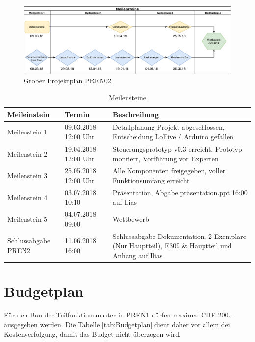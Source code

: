 \documentclass[a4paper]{report}
\begin{document}
\begin{figure}[h!]
	\includegraphics[width=\linewidth,keepaspectratio]{Rahmenplan}
	\caption{Grober Projektplan PREN02}
	\label{fig:GrobProjekt}
\end{figure}

\begin{table}[h!]
\vspace{1em}
\noindent
\begin{tabular}{|p{}|p{}|p{}|}
	\hline
	\textbf{Meileinstein} & \textbf{Termin} & \textbf{Beschreibung} \\
	\hline
	Meilenstein 1 & 09.03.2018 12:00 Uhr & Detailplanung Projekt abgeschlossen, Entscheidung LoFive / Arduino gefallen\\
	\hline
	Meilenstein 2 & 19.04.2018 12:00 Uhr & Steuerungsprototyp v0.3 erreicht, Prototyp  montiert, Vorführung vor Experten\\
	\hline
	Meilenstein 3 & 25.05.2018 12:00 Uhr & Alle Komponenten freigegeben, voller Funktionsumfang erreicht\\
	\hline
	Meilenstein 4 & 03.07.2018 10:10 & Präsentation, Abgabe präsentation.ppt 16:00 auf Ilias\\
	\hline
	Meilenstein 5 & 04.07.2018 09:00 & Wettbewerb\\
	\hline
	Schlussabgabe PREN2 & 11.06.2018 16:00 & Schlussabgabe Dokumentation, 2 Exemplare (Nur Hauptteil), E309 \& Hauptteil und Anhang auf Ilias \\
	\hline
	\end{tabular}
	\caption{Meilensteine}
	\label{tab:Meilensteine}
\end{table}

\newpage

\section{Budgetplan}
\label{sec:Budgetplan}
Für den Bau der Teilfunktionsmuster in PREN1 dürfen maximal CHF 200.- ausgegeben werden. Die Tabelle \ref{tab:Budgetplan} dient daher vor allem der Kostenverfolgung, damit das Budget nicht überzogen wird.
\end{document}
